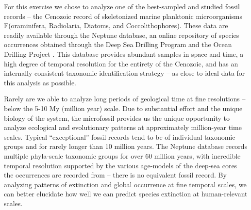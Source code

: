 \documentclass[12pt,letterpaper]{article}
\begin{document}
For this exercise we chose to analyze one of the best-sampled and studied fossil records -- the Cenozoic record of skeletonized marine planktonic microorganisms F(oraminifera, Radiolaria, Diatoms, and Coccolithophores). These data are readily available through the Neptune database, an online repository of species occurrences obtained through the Deep Sea Drilling Program and the Ocean Drilling Project \citep{Lazarus1994,SpencerCervato1999}. This database provides abundant samples in space and time, a high degree of temporal resolution for the entirety of the Cenozoic, and has an internally consistent taxonomic identification strategy -- as close to ideal data for this analysis as possible. 

Rarely are we able to analyze long periods of geological time at fine resolutions -- below the 5-10 My (million year) scale. Due to substantial effort and the unique biology of the system, the microfossil provides us the unique opportunity to analyze ecological and evolutionary patterns at approximately million-year time scales. Typical ``exceptional'' fossil records tend to be of individual taxonomic groups and for rarely longer than 10 million years. The Neptune database records multiple phyla-scale taxonomic groups for over 60 million years, with incredible temporal resolution supported by the various age-models of the deep-sea cores the occurrences are recorded from -- there is no equivalent fossil record. By analyzing patterns of extinction and global occurrence at fine temporal scales, we can better elucidate how well we can predict species extinction at human-relevant scales.

\end{document}
